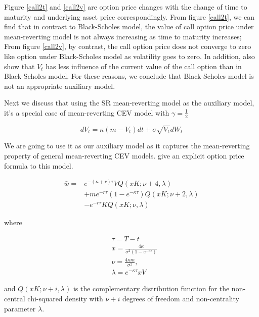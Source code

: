 Figure \ref{call2t} and \ref{call2v} are option price changes with the change of time to maturity and underlying asset price correspondingly. From figure \ref{call2t}, we can find that in contrast to Black-Scholes model, the value of call option price under mean-reverting model is not always increasing as time to maturity increases; From figure \ref{call2v}, by contrast, the call option price does not converge to zero like option under Black-Scholes model as volatility goes to zero. In addition, \cite{grunbichler_valuing_1996} also show that $V_t$ has less influence of the current value of the call option than in Black-Scholes model. For these reasons, we conclude that Black-Scholes model is not an appropriate auxiliary model.

Next we discuss that using the SR mean-reverting model as the auxiliary model, it's a special case of mean-reverting CEV model with $\gamma=\frac{1}{2}$

\begin{equation}
    d V_t=\kappa(m - V_t) d t+\sigma \sqrt{V_t} d W_t
\end{equation}

\noindent We are going to use it as our auxiliary model as it captures the mean-reverting property of general mean-reverting CEV models. \cite{grunbichler_valuing_1996} give an explicit option price formula to this model.

\begin{equation}\label{aux call price}
    \begin{aligned}
        \bar{w}=&  e^{ -(\kappa+r) \tau} V Q(x K ; \nu+4, \lambda) \\
        &+ m e^{-r \tau}(1-e^{-\kappa \tau}) Q(xK ; \nu+2, \lambda) \\
        &-e^{-r \tau} K Q(x K; \nu, \lambda)
        \end{aligned}
\end{equation}

\noindent where

$$
\begin{aligned}\label{para}
    & \tau = T-t\\
    &x=\frac{4 \kappa}{\sigma^{2}(1-e^{-\kappa \tau})} \\
    &\nu=\frac{4 \kappa m}{\sigma^{2}}, \\
    &\lambda= e^{-\kappa \tau}x V
    \end{aligned}
$$

\noindent and $Q(xK ; \nu+i, \lambda)$ is the complementary distribution function for the non-central chi-squared density with $\nu + i$ degrees of freedom and non-centrality parameter $\lambda$.

